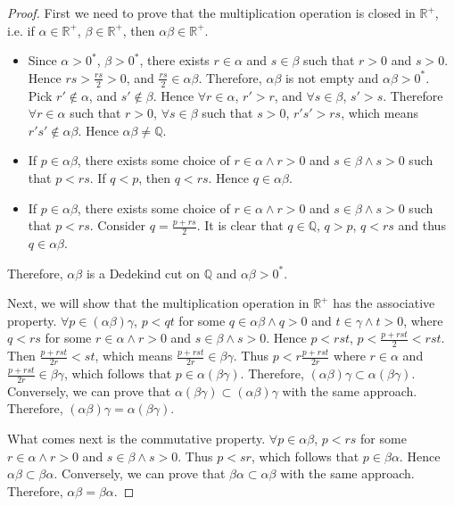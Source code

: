 \documentclass{article}
\begin{document}
\begin{proof}
  First we need to prove that the multiplication operation is closed in 
  $\mathbb{R^+}$, i.e. if $\alpha \in \mathbb{R^+}$, $\beta \in \mathbb{R^+}$, 
  then $\alpha \beta \in \mathbb{R^+}$.
  \begin{itemize}
    \item Since $\alpha > 0^*$, $\beta > 0^*$, there exists $r \in \alpha$ and 
    $s \in \beta$ such that $r > 0$ and $s > 0$. Hence $rs > \frac{rs}{2} > 0$, 
    and $\frac{rs}{2} \in \alpha \beta$. Therefore, $\alpha \beta$ is not empty 
    and $\alpha \beta > 0^*$. Pick $r' \notin \alpha$, and $s' \notin \beta$. 
    Hence $\forall r \in \alpha$, $r' > r$, and $\forall s \in \beta$, $s' > s$. 
    Therefore $\forall r \in \alpha$ such that $r > 0$, $\forall s \in \beta$ 
    such that $s > 0$, $r's' > rs$, which means $r's' \notin \alpha \beta$. 
    Hence $\alpha \beta \neq \mathbb{Q}$.
    \item If $p \in \alpha \beta$, there exists some choice of 
    $r \in \alpha \wedge r > 0$ and $s \in \beta \wedge s > 0$ such that $p < rs$. 
    If $q < p$, then $q < rs$. Hence $q \in \alpha \beta$.
    \item If $p \in \alpha \beta$, there exists some choice of 
    $r \in \alpha \wedge r > 0$ and $s \in \beta \wedge s > 0$ such that $p < rs$.
    Consider $q = \frac{p + rs}{2}$. It is clear that $q \in \mathbb{Q}$, 
    $q > p$, $q < rs$ and thus $q \in \alpha \beta$.
  \end{itemize}
  Therefore, $\alpha \beta$ is a Dedekind cut on $\mathbb{Q}$ and 
  $\alpha \beta > 0^*$.

  Next, we will show that the multiplication operation in $\mathbb{R^+}$ has the 
  associative property. $\forall p \in (\alpha \beta) \gamma$, $p < qt$ for some 
  $q \in \alpha \beta \wedge q > 0$ and $t \in \gamma \wedge t > 0$, where 
  $q < rs$ for some $r \in \alpha \wedge r > 0$ and $s \in \beta \wedge s > 0$. 
  Hence $p < rst$, $p < \frac{p + rst}{2} < rst$. Then $\frac{p + rst}{2r} < st$, 
  which means $\frac{p + rst}{2r} \in \beta \gamma$. Thus 
  $p < r \frac{p + rst}{2r}$ where $r \in \alpha$ and 
  $\frac{p + rst}{2r} \in \beta \gamma$, which follows that 
  $p \in \alpha (\beta \gamma)$. Therefore, 
  $(\alpha \beta) \gamma \subset \alpha (\beta \gamma)$. Conversely, we can 
  prove that $\alpha (\beta \gamma) \subset (\alpha \beta) \gamma$ with the same 
  approach. Therefore, $(\alpha \beta) \gamma = \alpha (\beta \gamma)$.

  What comes next is the commutative property. $\forall p \in \alpha \beta$, 
  $p < rs$ for some $r \in \alpha \wedge r > 0$ and $s \in \beta \wedge s > 0$. 
  Thus $p < sr$, which follows that $p \in \beta \alpha$. Hence
  $\alpha \beta \subset \beta \alpha$. Conversely, we can prove that 
  $\beta \alpha \subset \alpha \beta$ with the same approach. Therefore, 
  $\alpha \beta = \beta \alpha$.


\end{proof}
\end{document}
